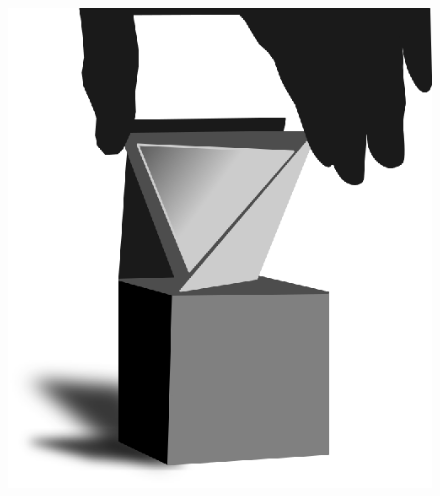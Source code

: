 \begin{figure}[H]
\centering
\includegraphics[scale=.9]{figure/fig_13.eps}
\caption{}\label{chap6-fig13}
\end{figure}

